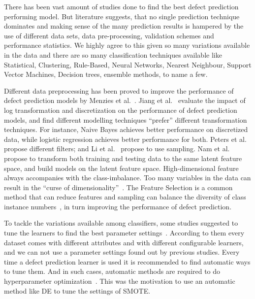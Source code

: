 \documentclass[sigconf,review, anonymous]{acmart}
\theoremstyle{break}
\begin{document}
There has been vast amount of studies done to find the best defect prediction performing model. But literature suggests, that no single prediction technique dominates and making sense of the many prediction results is hampered by the use of different data sets, data pre-processing, validation schemes and performance
statistics. We highly agree to this given so many variations available in the data 
and there are so many classification techniques available like Statistical, Clustering, Rule-Based, Neural Networks, Nearest Neighbour, Support Vector Machines, Decision trees, ensemble methods, to name a few.

Different data preprocessing has been proved
to improve the performance of defect prediction models by
Menzies et al.~\cite{menzies2007data}. Jiang et al.~\cite{jiang2008can} evaluate the impact of
log transformation and discretization on the performance
of defect prediction models, and find different modelling
techniques ``prefer'' different transformation techniques. For
instance, Naive Bayes achieves better performance on discretized
data, while logistic regression achieves better performance
for both. Peters et al.~\cite{peters2013better} propose different filters; and Li et al.~\cite{li2012sample} propose
to use sampling. Nam et al.~\cite{nam2013transfer} propose to transform both
training and testing data to the same latent feature space,
and build models on the latent feature space.  High-dimensional feature always accompanies with the class-imbalance. Too many variables in the data
can result in the ``curse of dimensionality''~\cite{friedman1997bias}. The Feature Selection is a common method that can
reduce features and sampling can balance the diversity of
class instance numbers~\cite{yin2015empirical}, in turn improving the performance of defect prediction.

To tackle the variations available among classifiers, some studies suggested to tune the learners to find the best parameter settings~\cite{tantithamthavorn2016automated, fu2016tuning}.  According to them every dataset comes with different attributes and with different configurable learners, and we can not use a parameter settings found out by previous studies. Every time a defect prediction learner is used it is recommended to find automatic ways to tune them. And in such cases, automatic 
methods are required to do hyperparameter optimization~\cite{agrawal2016wrong, fu2016tuning}. This was the motivation to use an automatic method like DE to
tune the settings of SMOTE.
\end{document}
